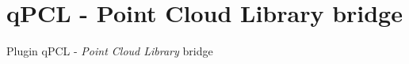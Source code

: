 \section{qPCL - Point Cloud Library bridge}
\label{subsection:qPCL}

Plugin qPCL - \emph{Point Cloud Library} bridge